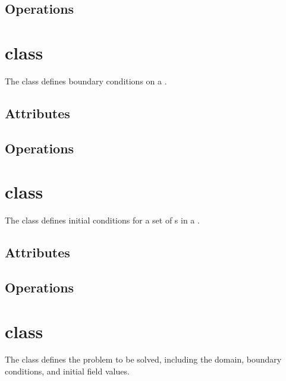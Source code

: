 \documentclass{book}
\begin{document}
\subsection{Operations}

\section{ class}

The  class defines boundary conditions on a .



\subsection{Attributes}

\subsection{Operations}

\section{ class}

The  class defines initial conditions for a set of
s in a .


\subsection{Attributes}

\subsection{Operations}

\section{ class}

The  class defines the problem to be solved, including
the domain, boundary conditions, and initial field values.
\end{document}
